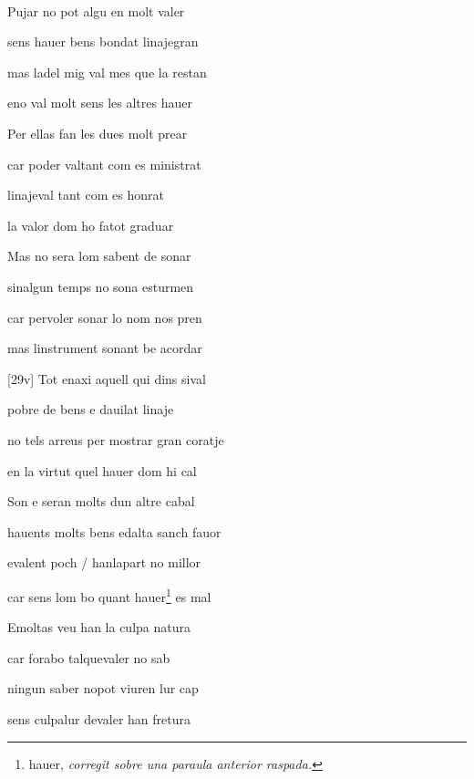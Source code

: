 \documentclass[12pt]{article}
\renewcommand{\espaiAbansEtiquetaPoema}{\vspace{0ex}}
\begin{document}
\begin{estrofa}

\espaiAbansEtiquetaPoema

\\

\end{estrofa}


\begin{estrofa}

 Pujar no pot algu en molt valer

 sens hauer bens bondat linajegran

 mas ladel mig val mes que la restan

 eno val molt sens les altres hauer

 Per ellas fan les dues molt prear

 car poder valtant com es ministrat

 linajeval tant com es  honrat

 la valor dom ho fatot graduar

\end{estrofa}



\begin{estrofa}

 Mas no sera lom sabent de sonar

 sinalgun temps no sona esturmen

 car pervoler sonar lo nom nos pren

 mas linstrument sonant be acordar

 [29v] Tot enaxi aquell qui dins sival

 pobre de bens e dauilat linaje

 no tels arreus per mostrar gran coratje

 en la virtut quel hauer dom hi cal

\end{estrofa}



\begin{estrofa}

 Son e seran molts dun altre cabal

 hauents molts bens edalta sanch fauor

 evalent poch / hanlapart no millor

 car sens lom bo quant  hauer\footnote{hauer, \textit{corregit sobre una
paraula anterior raspada.}} es mal

 Emoltas veu han la culpa natura

 car forabo talquevaler no sab

 ningun saber nopot viuren lur cap

 sens culpalur devaler han fretura

\end{estrofa}
\end{document}
